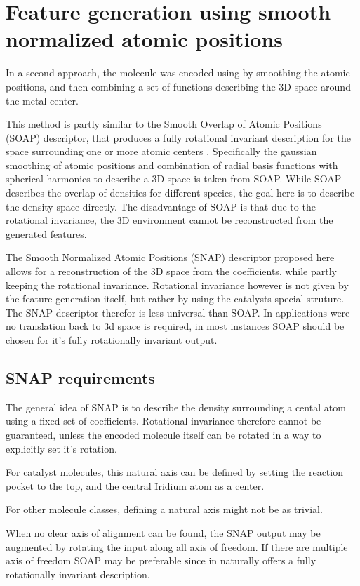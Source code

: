\section{Feature generation using smooth normalized atomic positions}

In a second approach, the molecule was encoded using by smoothing the atomic positions, 
and then combining a set of functions describing the 3D space around the metal center.

This method is partly similar to the Smooth Overlap of Atomic Positions (SOAP) descriptor, that produces a 
fully rotational invariant description for the space surrounding one or more atomic centers \cite{Bart_k_2013}.
Specifically the gaussian smoothing of atomic positions and combination of radial basis functions with
spherical harmonics to describe a 3D space is taken from SOAP.
While SOAP describes the overlap of densities for different species, the goal here is to describe the density space directly.
The disadvantage of SOAP is that due to the rotational invariance, the 3D environment cannot be reconstructed from the generated features.

The Smooth Normalized Atomic Positions (SNAP) descriptor proposed here allows for a reconstruction of the 3D space from the coefficients, 
while partly keeping the rotational invariance.
Rotational invariance however is not given by the feature generation itself, but rather by using the catalysts special struture.
The SNAP descriptor therefor is less universal than SOAP. 
In applications were no translation back to 3d space is required,
in most instances SOAP should be chosen for it's fully rotationally invariant output.

\subsection{SNAP requirements}

The general idea of SNAP is to describe the density surrounding a cental atom using a fixed set of coefficients.
Rotational invariance therefore cannot be guaranteed, unless the encoded molecule itself can be rotated in a way to explicitly set it's rotation.

For catalyst molecules, this natural axis can be defined by setting the reaction pocket to the top, and the central Iridium atom as a center.

For other molecule classes, defining a natural axis might not be as trivial.

When no clear axis of alignment can be found, the SNAP output may be augmented by rotating the input along all axis of freedom.
If there are multiple axis of freedom SOAP may be preferable since in naturally offers a fully rotationally invariant description.

